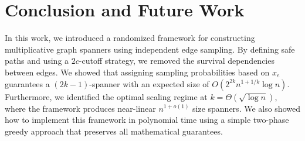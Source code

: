 \documentclass[11pt,a4paper]{article}
\begin{document}




\section{Conclusion and Future Work}

In this work, we introduced a randomized framework for constructing multiplicative graph spanners using independent edge sampling. By defining safe paths and using a $2c$-cutoff strategy, we removed the survival dependencies between edges. We showed that assigning sampling probabilities based on $x_e$ guarantees a $(2k-1)$-spanner with an expected size of $O(2^{2k} n^{1+1/k} \log n)$. Furthermore, we identified the optimal scaling regime at $k = \Theta(\sqrt{\log n})$, where the framework produces near-linear $n^{1+o(1)}$ size spanners. We also showed how to implement this framework in polynomial time using a simple two-phase greedy approach that preserves all mathematical guarantees.
\end{document}

